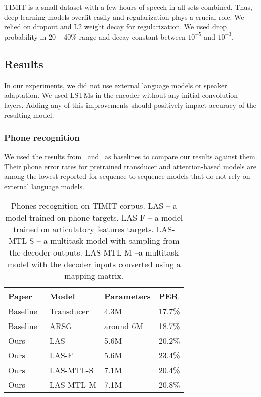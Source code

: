 \documentclass[a4paper]{article}
\begin{document}
TIMIT is a small dataset with a few hours of speech in all sets combined. Thus, deep learning models overfit easily and regularization plays a crucial role. We relied on dropout and L2 weight decay for regularization. We used drop probability in 20 -- 40\% range and decay constant between $10^{-5}$ and $10^{-3}$.

\subsection{Results}
In our experiments, we did not use external language models or speaker adaptation. We used LSTMs in the encoder without any initial convolution layers. Adding any of this improvements should positively impact accuracy of the resulting model.

\subsubsection{Phone recognition}
We used the results from~\cite{Graves2013} and~\cite{Chorowski-Att-2015} as baselines to compare our results against them. Their phone error rates for pretrained transducer and attention-based models are among the lowest reported for sequence-to-sequence models that do not rely on external language models.
\begin{table}[th]
  \caption{Phones recognition on TIMIT corpus. LAS -- a model trained on phone targets. LAS-F -- a model trained on articulatory features targets. LAS-MTL-S -- a multitask model with sampling from the decoder outputs. LAS-MTL-M --a  multitask model with the decoder inputs converted using a mapping matrix.}
  \label{tab:PhoneRecTimit}
\centering
  \begin{tabular}{llll}
    \toprule
    \textbf{Paper} & \textbf{Model} & \textbf{Parameters} & \textbf{PER} \\
    \midrule
    Baseline~\cite{Graves2013} & Transducer & 4.3M & 17.7\% \\
    Baseline~\cite{Chorowski-Att-2015} & ARSG & around 6M & 18.7\% \\
    Ours & LAS & 5.6M & 20.2\% \\
    Ours & LAS-F & 5.6M & 23.4\% \\
    Ours & LAS-MTL-S & 7.1M & 20.4\% \\
    Ours & LAS-MTL-M & 7.1M & 20.8\% \\
    \bottomrule
  \end{tabular}
\end{table}
\end{document}
